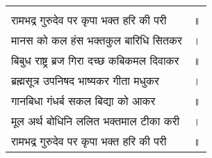 



\fontsize{16}{21}\selectfont

{\bfseries
\setlength{\mylenone}{0pt}
\settowidth{\mylentwo}{रामभद्र गुरुदेव पर कृपा भक्त हरि की परी}
\setlength{\mylenone}{\maxof{\mylenone}{\mylentwo}}
\settowidth{\mylentwo}{मानस को कल हंस भक्तकुल बारिधि सितकर}
\setlength{\mylenone}{\maxof{\mylenone}{\mylentwo}}
\settowidth{\mylentwo}{बिबुध राष्ट्र ब्रज गिरा दच्छ कबिकमल दिवाकर}
\setlength{\mylenone}{\maxof{\mylenone}{\mylentwo}}
\settowidth{\mylentwo}{ब्रह्मसूत्र उपनिषद भाष्यकर गीता मधुकर}
\setlength{\mylenone}{\maxof{\mylenone}{\mylentwo}}
\settowidth{\mylentwo}{गानबिधा गंधर्ब सकल बिद्या को आकर}
\setlength{\mylenone}{\maxof{\mylenone}{\mylentwo}}
\settowidth{\mylentwo}{मूल अर्थ बोधिनि ललित भक्तमाल टीका करी}
\setlength{\mylenone}{\maxof{\mylenone}{\mylentwo}}
\settowidth{\mylentwo}{रामभद्र गुरुदेव पर कृपा भक्त हरि की परी}
\setlength{\mylenone}{\maxof{\mylenone}{\mylentwo}}
\setlength{\mylentwo}{\baselineskip}
\setlength{\mylenone}{\mylenone + 1pt}
\begin{longtable}[l]{@{\hspace*{\mylen}}>{\setlength\parfillskip{0pt}}p{\mylenone}@{}@{}l@{}}
 & \\[-\the\mylentwo]
रामभद्र गुरुदेव पर कृपा भक्त हरि की परी & ॥\\ \nopagebreak
मानस को कल हंस भक्तकुल बारिधि सितकर & ।\\ \nopagebreak
बिबुध राष्ट्र ब्रज गिरा दच्छ कबिकमल दिवाकर & ॥\\
ब्रह्मसूत्र उपनिषद भाष्यकर गीता मधुकर & ।\\ \nopagebreak
गानबिधा गंधर्ब सकल बिद्या को आकर & ॥\\
मूल अर्थ बोधिनि ललित भक्तमाल टीका करी & ।\\ \nopagebreak
रामभद्र गुरुदेव पर कृपा भक्त हरि की परी & ॥\\
\end{longtable}
}

